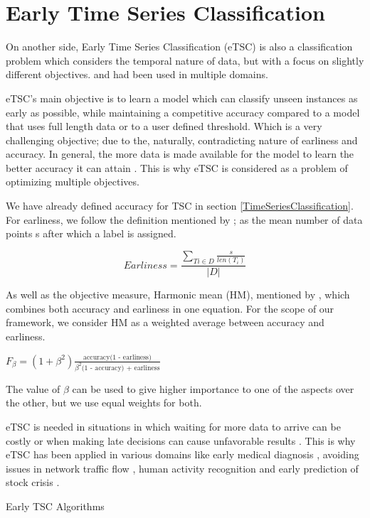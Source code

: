 \section{Early Time Series Classification}
\label{EarlyTimeSeriesClassification}
On another side, Early Time Series Classification (eTSC) is also a classification problem which considers the temporal nature of data,
but with a focus on slightly different objectives.  and had been used in multiple domains.

eTSC's main objective is to learn a model which can classify unseen instances as early as possible,
while maintaining a competitive accuracy compared to a model that uses full length data or to a user defined threshold\cite{xing2009early}.
Which is a very challenging objective; due to the, naturally, contradicting nature of earliness and accuracy.
In general, the more data is made available for the model to learn the better accuracy it can attain \cite{mori2019early,tavenard2016cost,xing2012early,mori2017reliable}.
This is why eTSC is considered as a problem of optimizing multiple objectives.

We have already defined accuracy for TSC in section \ref{TimeSeriesClassification}.
For earliness, we follow the definition mentioned by \cite{schafer2020teaser}; as the mean number of data points s after which a label is assigned.
\begin{definition}
    \label{DefinitionEarliness}
    \[ \textstyle Earliness = \frac{\sum_{T{i}\in D}\frac{s}{len(T_{i})}}{|D|} \]
\end{definition}
As well as the objective measure, Harmonic mean (HM), mentioned by \cite{ghalwash2012early,schafer2020teaser}, which combines both accuracy and earliness in one equation.
For the scope of our framework, we consider HM as a weighted average between accuracy and earliness.
\begin{definition}
    \label{DefinitionHM}
    $F_{\beta} = (1 + \beta^2)\frac{\text{accuracy(1 - earliness)}}{\beta^2 \text{(1 - accuracy) + earliness}}$
\end{definition}
The value of $\beta$ can be used to give higher importance to one of the aspects over the other, but we use equal weights for both.

eTSC is needed in situations in which waiting for more data to arrive can be costly or
when making late decisions can cause unfavorable results \cite{mori2017early,parrish2013classifying,lin2015reliable}.
This is why eTSC has been applied in various domains like early medical diagnosis \cite{griffin2001toward,ghalwash2012early},
avoiding issues in network traffic flow \cite{bernaille2006traffic}, human activity recognition \cite{yazdanbakhsh2019multivariate,gupta2020fault}
and early prediction of stock crisis \cite{ghalwash2014utilizing}.

{Early TSC Algorithms}